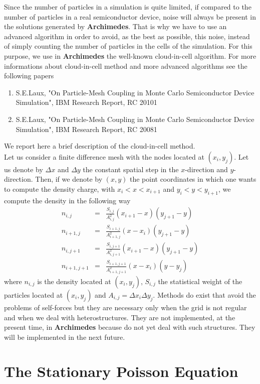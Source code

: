 \documentclass[12pt]{book}
\begin{document}
Since the number of particles in a simulation is quite limited, if compared to the number of particles in a real semiconductor device, noise will always be present in the solutions generated by \textbf{Archimedes}. That is why we have to use an advanced algorithm in order to avoid, as the best as possible, this noise, instead of simply counting the number of particles in the cells of the simulation. For this purpose, we use in \textbf{Archimedes} the well-known cloud-in-cell algorithm. For more informations about cloud-in-cell method and more advanced algorithms see the following papers
\begin{enumerate}
\item
S.E.Laux, "On Particle-Mesh Coupling in Monte Carlo Semiconductor Device Simulation", IBM Research Report, RC 20101
\item
S.E.Laux, "On Particle-Mesh Coupling in Monte Carlo Semiconductor Device Simulation", IBM Research Report, RC 20081
\end{enumerate}
We report here a brief description of the cloud-in-cell method.
\\
Let us consider a finite difference mesh with the nodes located at $(x_i,y_j)$. Let us denote by $\Delta x$ and $\Delta y$ the constant spatial step in the $x$-direction and $y$-direction. Then, if we denote by $(x,y)$ the point coordinates in which one wants to compute the density charge, with $x_i<x<x_{i+1}$ and $y_i<y<y_{i+1}$, we compute the density in the following way
\begin{eqnarray}
 n_{i,j} &=& \frac{S_{i,j}}{A_{i,j}^2} (x_{i+1} - x) (y_{j+1} - y) \\
 n_{i+1,j} &=& \frac{S_{i+1,j}}{A_{i+1,j}^2} (x - x_i) (y_{j+1} - y) \\
 n_{i,j+1} &=& \frac{S_{i,j+1}}{A_{i,j+1}^2}(x_{i+1} - x) (y_{j+1} - y) \\
 n_{i+1,j+1} &=& \frac{S_{i+1,j+1}}{A_{i+1,j+1}^2} (x-x_i) (y-y_j)
\end{eqnarray}
where $n_{i,j}$ is the density located at $(x_i,y_j)$, $S_{i,j}$ the statistical weight of the particles located at $(x_i,y_j)$ and $A_{i,j}= \Delta x_i \Delta y_j$.
Methods do exist that avoid the problems of self-forces but they are necessary only when the grid is not regular and when we deal with heterostructures. They are not implemented, at the present time, in \textbf{Archimedes} because do not yet deal with such structures. They will be implemented in the next future.

\section{The Stationary Poisson Equation}
\end{document}
